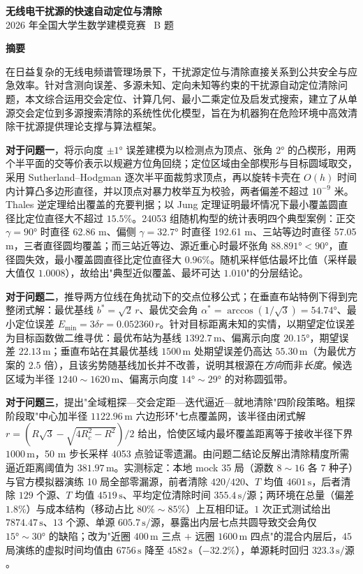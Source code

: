 \documentclass[12pt,a4paper]{ctexart}
\begin{document}
\thispagestyle{plain}
\setcounter{page}{1}
\begin{center}
  {\LARGE\bfseries 无线电干扰源的快速自动定位与清除}\\[8pt]
  {\large 2026 年全国大学生数学建模竞赛 \, B 题}
\end{center}

\vspace{1em}
\noindent\textbf{摘\quad 要}

\vspace{0.5em}
在日益复杂的无线电频谱管理场景下，干扰源定位与清除直接关系到公共安全与应急效率。针对含测向误差、多源未知、定向未知等约束的干扰源自动定位清除问题，本文综合运用交会定位、计算几何、最小二乘定位及启发式搜索，建立了从单源交会定位到多源搜索清除的系统性优化模型，旨在为机器狗在危险环境中高效清除干扰源提供理论支撑与算法框架。

\textbf{对于问题一}，将示向度 $\pm1°$ 误差建模为以检测点为顶点、张角 $2°$ 的凸楔形，用两个半平面的交等价表示以规避方位角回绕；定位区域由全部楔形与目标圆域取交，采用 Sutherland--Hodgman 逐次半平面裁剪求顶点，再以旋转卡壳在 $O(h)$ 时间内计算凸多边形直径，并以顶点对暴力枚举互为校验，两者偏差不超过 $10^{-9}$ 米。Thales 逆定理给出覆盖的充要判据；以 Jung 定理证明最坏情况下最小覆盖圆直径比定位直径大不超过 $15.5\%$。24053 组随机构型的统计表明四个典型案例：正交 $\gamma=90°$ 时直径 62.86 m、偏侧 $\gamma=32.7°$ 时直径 192.61 m、三站等边时直径 57.05 m，三者直径圆均覆盖；而三站近等边、源近重心时最坏张角 $88.891°<90°$，直径圆失效，最小覆盖圆直径比定位直径大 $0.96\%$。随机采样低估最坏比值（采样最大值仅 $1.0008$），故给出"典型近似覆盖、最坏可达 $1.010$"的分层结论。

\textbf{对于问题二}，推导两方位线在角扰动下的交点位移公式；在垂直布站特例下得到完整闭式解：最优基线 $b^{*}=\sqrt{2}\,r$、最优交会角 $\alpha^{*}=\arccos(1/\sqrt{3})=54.74°$、最小定位误差 $E_{\min}=3\delta r=0.052360\,r$。针对目标距离未知的实情，以期望定位误差为目标函数做二维寻优：最优布站为基线 $1392.7\,\text{m}$、偏离示向度 $20.15°$，期望误差 $22.13\,\text{m}$；垂直布站在其最优基线 $1500\,\text{m}$ 处期望误差仍高达 $55.30\,\text{m}$（为最优方案的 $2.5$ 倍），且该劣势随基线加长并不改善，说明其根源在\emph{方向}而非\emph{长度}。候选区域为半径 $1240\sim1620\,\text{m}$、偏离示向度 $14°\sim29°$ 的对称圆弧带。

\textbf{对于问题三}，提出"全域粗探—交会定距—迭代逼近—就地清除"四阶段策略。粗探阶段取"中心加半径 $1122.96\,\text{m}$ 六边形环"七点覆盖网，该半径由闭式解 $r=(R\sqrt3-\sqrt{4R_c^2-R^2})/2$ 给出，恰使区域内最坏覆盖距离等于接收半径下界 $1000\,\text{m}$，50 m 步长采样 4053 点验证零遗漏。由问题二结论反解出清除精度所需逼近距离阈值为 $381.97\,\text{m}$。实测标定：本地 mock 35 局（源数 $8\sim16$ 各 7 种子）与官方模拟器演练 10 局全部零漏源，前者清除 $420/420$、$T$ 均值 $4601\,\text{s}$，后者清除 $129$ 个源、$T$ 均值 $4519\,\text{s}$、平均定位清除时间 $355.4\,\text{s}/\text{源}$；两环境在总量（偏差 $1.8\%$）与成本结构（移动占比 $80\%\sim85\%$）上互相印证。$1$ 次正式测试给出 $7874.47\,\text{s}$、$13$ 个源、单源 $605.7\,\text{s}/\text{源}$，暴露出内层七点共圆导致交会角仅 $15°\sim30°$ 的缺陷；改为"近圈 $400\,\text{m}$ 三点 $+$ 远圈 $1600\,\text{m}$ 四点"的混合内层后，$45$ 局演练的虚拟时间均值由 $6756\,\text{s}$ 降至 $4582\,\text{s}$（$-32.2\%$），单源耗时回归 $323.3\,\text{s}/\text{源}$。
\end{document}
